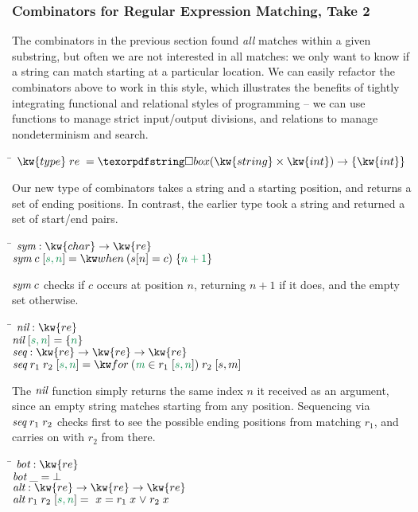 \subsubsection{Combinators for Regular Expression Matching, Take 2}

The combinators in the previous section found \emph{all} matches
within a given substring, but often we are not interested in all
matches: we only want to know if a string can match starting at a
particular location. We can easily refactor the combinators above to
work in this style, which illustrates the benefits of tightly
integrating functional and relational styles of programming -- we can
use functions to manage strict input/output divisions, and relations
to manage nondeterminism and search.
%
\begin{tabbing}
\qquad \=  $\kw{type}\;re\;=\iso (\kw{string} \times \kw{int}) \to \tset{\kw{int}}$ \+ 
\end{tabbing}
%
Our new type of combinators takes a string and a starting
position, and returns a set of ending positions. In contrast, the earlier type
took a string and returned a set of start/end pairs. 
%
\begin{tabbing}
\qquad \=  $\name{sym} : \kw{char} \to \kw{re}$\+ \\
  $\name{sym}\;c\;\ebox{s,n} = \ewhen{s[n] = c}{\eset{n+1}}$ 
\end{tabbing}
%
$\text{\itshape sym}\;c$ checks if $c$ occurs at position
$n$, returning $n+1$ if it does, and the empty
set otherwise. 
%
\begin{tabbing}
\qquad \=  $\name{nil} : \kw{re}$\+ \\
  $\name{nil}\;\ebox{s, n} = \eset{n}$ \\[1em]

  $\name{seq} : \kw{re} \to \kw{re} \to \kw{re}$ \\
  $\name{seq}\;r_1\;r_2\;\ebox{s,n} = \efor{m}{r_1\;\ebox{s,n}}{r_2\;[s,m]}$
\end{tabbing}
%
The $\text{\itshape nil}$ function simply returns the same index $n$ it received as an
argument, since an empty string matches starting from any position. Sequencing
via $\text{\itshape seq}\;r_1\;r_2$ checks first to see the possible ending positions from
matching $r_1$, and carries on with $r_2$ from there. 
%
\begin{tabbing}
  \qquad \=
  $\name{bot} : \kw{re}$ \+\\
  $\text{\itshape bot}\;\_ = \bot$ \\[1em]
  
  $\name{alt} : \kw{re} \to \kw{re} \to \kw{re}$ \\
  $\name{alt}\;r_1\;r_2\;\ebox{s,n} =\ x = r_1\;x \vee r_2\;x$ 
\end{tabbing}
